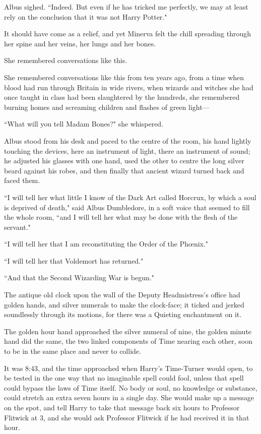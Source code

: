 Albus sighed. ``Indeed. But even if he has tricked me perfectly, we may at least rely on the conclusion that it was not Harry Potter."

It should have come as a relief, and yet Minerva felt the chill spreading through her spine and her veins, her lungs and her bones.

She remembered conversations like this.

She remembered conversations like this from ten years ago, from a time when blood had run through Britain in wide rivers, when wizards and witches she had once taught in class had been slaughtered by the hundreds, she remembered burning homes and screaming children and flashes of green light—

``What will you tell Madam Bones?" she whispered.

Albus stood from his desk and paced to the centre of the room, his hand lightly touching the devices, here an instrument of light, there an instrument of sound; he adjusted his glasses with one hand, used the other to centre the long silver beard against his robes, and then finally that ancient wizard turned back and faced them.

``I will tell her what little I know of the Dark Art called Horcrux, by which a soul is deprived of death," said Albus Dumbledore, in a soft voice that seemed to fill the whole room, ``and I will tell her what may be done with the flesh of the servant."

``I will tell her that I am reconstituting the Order of the Phœnix."

``I will tell her that Voldemort has returned."

``And that the Second Wizarding War is begun."


The antique old clock upon the wall of the Deputy Headmistress's office had golden hands, and silver numerals to make the clock-face; it ticked and jerked soundlessly through its motions, for there was a Quieting enchantment on it.

The golden hour hand approached the silver numeral of nine, the golden minute hand did the same, the two linked components of Time nearing each other, soon to be in the same place and never to collide.

It was 8:43\pm, and the time approached when Harry's Time-Turner would open, to be tested in the one way that no imaginable spell could fool, unless that spell could bypass the laws of Time itself. No body or soul, no knowledge or substance, could stretch an extra seven hours in a single day. She would make up a message on the spot, and tell Harry to take that message back six hours to Professor Flitwick at 3\pm, and she would ask Professor Flitwick if he had received it in that hour.

